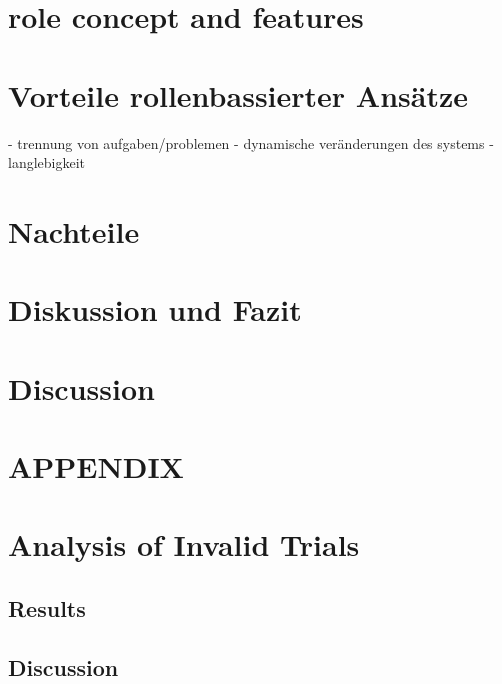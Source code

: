 \documentclass[prodmode,acmtap]{acmlarge}
\begin{document}
\section{role concept and features}

\section{Vorteile rollenbassierter Ansätze}
- trennung von aufgaben/problemen
- dynamische veränderungen des systems
- langlebigkeit
\section{Nachteile}
\section{Diskussion und Fazit}


\section{Discussion}


\appendix
\section*{APPENDIX}
\setcounter{section}{1}









\elecappendix


\section{Analysis of Invalid Trials}
\label{invalid}

\subsection{Results}





\subsection{Discussion}
\end{document}
